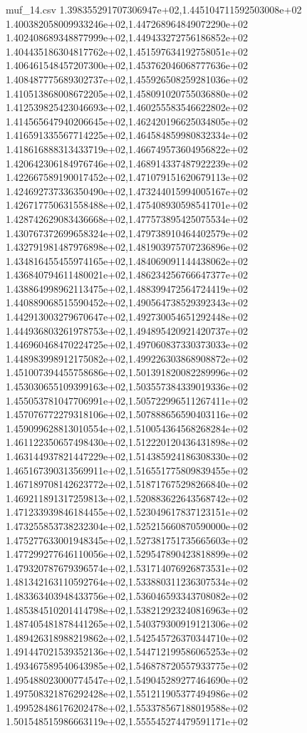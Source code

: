\begin{filecontents*}{muf_14.csv}
1.398355291707306947e+02,1.445104711592503008e+02
1.400382058009933246e+02,1.447268964849072290e+02
1.402408689348877999e+02,1.449433272756186852e+02
1.404435186304817762e+02,1.451597634192758051e+02
1.406461548457207300e+02,1.453762046068777636e+02
1.408487775689302737e+02,1.455926508259281036e+02
1.410513868008672205e+02,1.458091020755036880e+02
1.412539825423046693e+02,1.460255583546622802e+02
1.414565647940206645e+02,1.462420196625034805e+02
1.416591335567714225e+02,1.464584859980832334e+02
1.418616888313433719e+02,1.466749573604956822e+02
1.420642306184976746e+02,1.468914337487922239e+02
1.422667589190017452e+02,1.471079151620679113e+02
1.424692737336350490e+02,1.473244015994005167e+02
1.426717750631558488e+02,1.475408930598541701e+02
1.428742629083436668e+02,1.477573895425075534e+02
1.430767372699658324e+02,1.479738910464402579e+02
1.432791981487976898e+02,1.481903975707236896e+02
1.434816455455974165e+02,1.484069091144438062e+02
1.436840794611480021e+02,1.486234256766647377e+02
1.438864998962113475e+02,1.488399472564724419e+02
1.440889068515590452e+02,1.490564738529392343e+02
1.442913003279670647e+02,1.492730054651292448e+02
1.444936803261978753e+02,1.494895420921420737e+02
1.446960468470224725e+02,1.497060837330373033e+02
1.448983998912175082e+02,1.499226303868908872e+02
1.451007394455758686e+02,1.501391820082289996e+02
1.453030655109399163e+02,1.503557384339019336e+02
1.455053781047706991e+02,1.505722996511267411e+02
1.457076772279318106e+02,1.507888656590403116e+02
1.459099628813010554e+02,1.510054364568268284e+02
1.461122350657498430e+02,1.512220120436431898e+02
1.463144937821447229e+02,1.514385924186308330e+02
1.465167390313569911e+02,1.516551775809839455e+02
1.467189708142623772e+02,1.518717675298266840e+02
1.469211891317259813e+02,1.520883622643568742e+02
1.471233939846184455e+02,1.523049617837123151e+02
1.473255853738232304e+02,1.525215660870590000e+02
1.475277633001948345e+02,1.527381751735665603e+02
1.477299277646110056e+02,1.529547890423818899e+02
1.479320787679396574e+02,1.531714076926873531e+02
1.481342163110592764e+02,1.533880311236307534e+02
1.483363403948433756e+02,1.536046593343708082e+02
1.485384510201414798e+02,1.538212923240816963e+02
1.487405481878441265e+02,1.540379300919121306e+02
1.489426318988219862e+02,1.542545726370344710e+02
1.491447021539352136e+02,1.544712199586065253e+02
1.493467589540643985e+02,1.546878720557933775e+02
1.495488023000774547e+02,1.549045289277464690e+02
1.497508321876292428e+02,1.551211905377494986e+02
1.499528486176202478e+02,1.553378567188019588e+02
1.501548515986663119e+02,1.555545274479591171e+02

\end{filecontents*}
